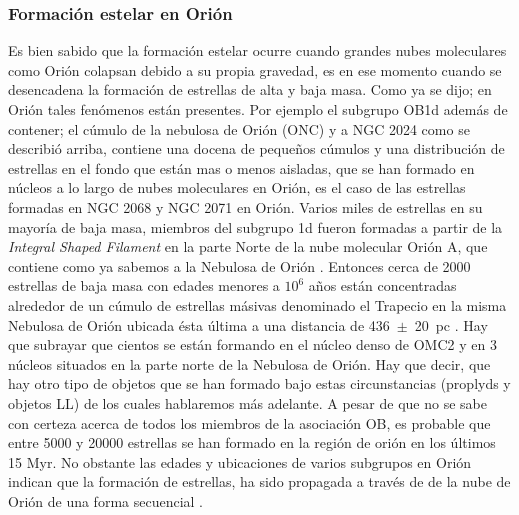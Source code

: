 \documentclass{article}
\begin{document}
\subsubsection{Formación estelar en Orión}
\label{sec:frormacion}

Es bien sabido que la formación estelar ocurre cuando grandes nubes moleculares como Orión colapsan debido a su propia gravedad, es en ese momento cuando se desencadena la formación de estrellas de alta y baja masa. Como ya se dijo; en Orión tales fenómenos están presentes. Por ejemplo el subgrupo OB1d además de contener; el cúmulo de la nebulosa de Orión (ONC) y a NGC 2024 como se describió arriba, contiene  una docena de pequeños cúmulos y una distribución de estrellas en el fondo que están mas o menos aisladas, que se han formado en núcleos a lo largo de nubes moleculares en Orión, es el caso de las estrellas formadas en NGC 2068 y NGC 2071 en Orión. Varios miles de estrellas en su mayoría de baja masa, miembros del subgrupo 1d fueron formadas a partir de la \textit{Integral Shaped Filament} \citep{Bally:1987} en la parte Norte de la nube molecular Orión A, que contiene como ya sabemos a la Nebulosa de Orión \citep{Johnstone:1999}. Entonces cerca de 2000 estrellas de baja masa con edades menores a \(10^6\) años están concentradas alrededor de un cúmulo de estrellas másivas denominado el Trapecio en la misma Nebulosa de Orión \citep{Hillenbrand:1997} ubicada ésta última a una distancia de 436~\(\pm\)~20~pc \citep{Odell:2008a}. Hay que subrayar que  cientos se están formando en el núcleo denso de OMC2 y en 3 núcleos situados en la parte norte de la Nebulosa de Orión. Hay que decir, que hay otro tipo de objetos que se han formado bajo estas circunstancias (proplyds y objetos LL) de los cuales hablaremos más adelante. A pesar de que no se sabe con certeza acerca de todos los miembros de la asociación OB, es probable que entre 5000 y 20000 estrellas se han formado en la región de orión en los últimos 15 Myr. No obstante las edades y ubicaciones de varios subgrupos en Orión indican que la formación de estrellas, ha sido propagada a través de de la nube de Orión de una forma secuencial \citep{Bally:2008a}. \\  
 
\end{document}
